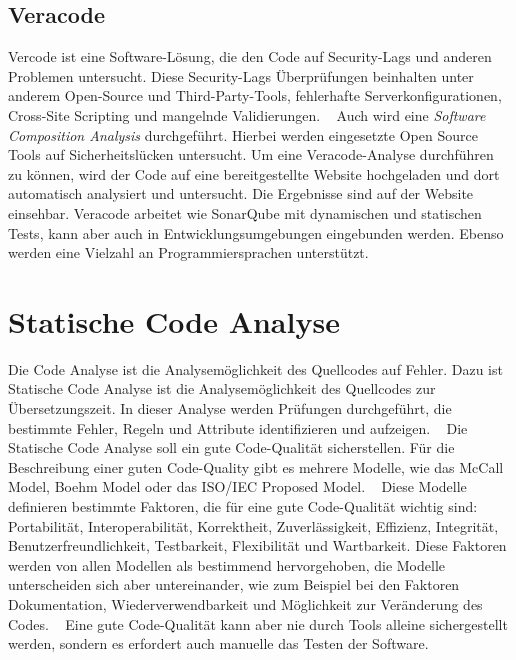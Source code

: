 \subsection{Veracode}
Vercode ist eine Software-Lösung, die den Code auf Security-Lags und anderen Problemen untersucht. Diese Security-Lags Überprüfungen beinhalten unter anderem Open-Source und Third-Party-Tools, fehlerhafte Serverkonfigurationen, Cross-Site Scripting und mangelnde Validierungen. ~\parencite{veracodeSecurity}  Auch wird eine \textit{Software Composition Analysis} durchgeführt. Hierbei werden eingesetzte Open Source Tools auf Sicherheitslücken untersucht. Um eine Veracode-Analyse durchführen zu können, wird der Code auf eine bereitgestellte Website hochgeladen und dort automatisch analysiert und untersucht. Die Ergebnisse sind auf der Website einsehbar. Veracode arbeitet wie SonarQube mit dynamischen und statischen Tests, kann aber auch in Entwicklungsumgebungen eingebunden werden. Ebenso werden eine Vielzahl an Programmiersprachen unterstützt.  ~\parencite{veracodeDig}  

\section{Statische Code Analyse}
Die Code Analyse ist die Analysemöglichkeit des Quellcodes auf Fehler. Dazu ist Statische Code Analyse ist die Analysemöglichkeit des Quellcodes zur Übersetzungszeit. In dieser Analyse werden Prüfungen durchgeführt, die bestimmte Fehler, Regeln und Attribute identifizieren und aufzeigen. ~\parencite{gomes2009overview}
Die Statische Code Analyse soll ein gute Code-Qualität sicherstellen. Für die Beschreibung einer guten Code-Quality gibt es mehrere Modelle, wie das McCall Model, Boehm Model oder das ISO/IEC Proposed Model. ~\parencite{al2011software} Diese Modelle definieren bestimmte Faktoren, die für eine gute Code-Qualität wichtig sind: Portabilität, Interoperabilität, Korrektheit, Zuverlässigkeit, Effizienz, Integrität, Benutzerfreundlichkeit, Testbarkeit, Flexibilität und Wartbarkeit. \parencite{iqbalCodeQualityApproach} Diese Faktoren werden von allen Modellen als bestimmend hervorgehoben, die Modelle unterscheiden sich aber untereinander, wie zum Beispiel bei den Faktoren Dokumentation, Wiederverwendbarkeit und Möglichkeit zur Veränderung des Codes. ~\parencite{boukouchiModels}
Eine gute Code-Qualität kann aber nie durch Tools alleine sichergestellt werden, sondern es erfordert auch manuelle das Testen der Software. 

